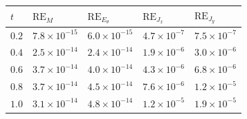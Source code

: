 \begin{tabular}{lllll}
\toprule
\(t\) & \(\mathrm{RE}_{M}\) & \(\mathrm{RE}_{E_\theta}\) & \(\mathrm{RE}_{J_x}\) & \(\mathrm{RE}_{J_y}\) \\
\midrule
\(0.2\) & \(7.8\times10^{-15}\) & \(6.0\times10^{-15}\) & \(4.7\times10^{-7}\) & \(7.5\times10^{-7}\) \\
\(0.4\) & \(2.5\times10^{-14}\) & \(2.4\times10^{-14}\) & \(1.9\times10^{-6}\) & \(3.0\times10^{-6}\) \\
\(0.6\) & \(3.7\times10^{-14}\) & \(4.0\times10^{-14}\) & \(4.3\times10^{-6}\) & \(6.8\times10^{-6}\) \\
\(0.8\) & \(3.7\times10^{-14}\) & \(4.5\times10^{-14}\) & \(7.6\times10^{-6}\) & \(1.2\times10^{-5}\) \\
\(1.0\) & \(3.1\times10^{-14}\) & \(4.8\times10^{-14}\) & \(1.2\times10^{-5}\) & \(1.9\times10^{-5}\) \\
\bottomrule
\end{tabular}
